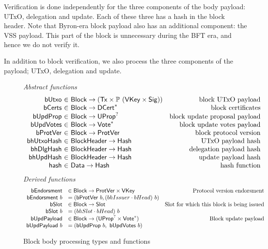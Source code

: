 \documentclass[11pt,a4paper]{article}
\newcommand{\powerset}[1]{\mathbb{P}~#1}
\newcommand{\fun}[1]{\mathsf{#1}}
\newcommand{\type}[1]{\mathsf{#1}}
\newcommand{\seqof}[1]{#1^{*}}
\newcommand{\totalf}{\to}
\newcommand{\Hash}{\type{Hash}}  %
\newcommand{\Slot}{\type{Slot}}
\newcommand{\Block}{\type{Block}}
\newcommand{\DCert}{\type{DCert}}
\newcommand{\Tx}{\type{Tx}}
\newcommand{\VKey}{\type{VKey}}
\newcommand{\Sig}{\type{Sig}}
\newcommand{\bcertsname}{bCerts}
\newcommand{\bhissuername}{bhIssuer}
\begin{document}
Verification is done independently for the three components of the body payload:
UTxO, delegation and update. Each of these three has a hash in the block
header. Note that Byron-era block payload also has an additional component: the
VSS payload. This part of the block is unnecessary during the BFT era, and hence
we do not verify it.

In addition to block verification, we also process the three components of the
payload; UTxO, delegation and update.

\begin{figure}[ht]
  \emph{Abstract functions}
  \begin{equation*}
    \begin{array}{r@{~\in~}lr}
      \fun{bUtxo} & \Block \totalf (\Tx \times \powerset{(\VKey \times \Sig)}) & \text{block UTxO payload} \\
      \fun{\bcertsname} & \Block \totalf \seqof{\DCert}
                                         & \text{block certificates} \\
      \fun{bUpdProp} & \Block \totalf \UProp^{?} & \text{block update proposal payload} \\
      \fun{bUpdVotes} & \Block \totalf \seqof{\Vote} & \text{block update votes payload} \\
      \fun{bProtVer} & \Block \totalf \ProtVer & \text{block protocol version} \\
      \fun{bhUtxoHash} & \Bhead \totalf \Hash & \text{UTxO payload hash} \\
      \fun{bhDlgHash} & \Bhead \totalf \Hash & \text{delegation payload hash} \\
      \fun{bhUpdHash} & \Bhead \totalf \Hash & \text{update payload hash} \\
      \fun{hash} & \type{Data} \totalf \Hash & \text{hash function} \\
    \end{array}
  \end{equation*}
  \emph{Derived functions}
  \begin{equation*}
    \begin{array}{rlr}
      \fun{bEndorsment} & \in \Block \to \ProtVer \times \VKey & \text{Protocol version endorsment} \\
      \bendorsment{b} & = (\bprotver{b}, (\bhissuername \cdot \bheadname) ~ b)\\
      \fun{\bslotname} & \in \Block \to \Slot & \text{Slot for which this block is being issued} \\
      \bslot{b} & = (\bhslotname \cdot \bheadname)~b \\
      \fun{\bupdpayloadname} & \in \Block \to (\UProp^{?}\times\seqof{\Vote}) & \text{Block update payload} \\
      \bupdpayload{b} & = (\bupdprop{b},~\bupdvotes{b})
    \end{array}
  \end{equation*}
  \caption{Block body processing types and functions}
  \label{fig:defs:bbody}
\end{figure}
\end{document}
